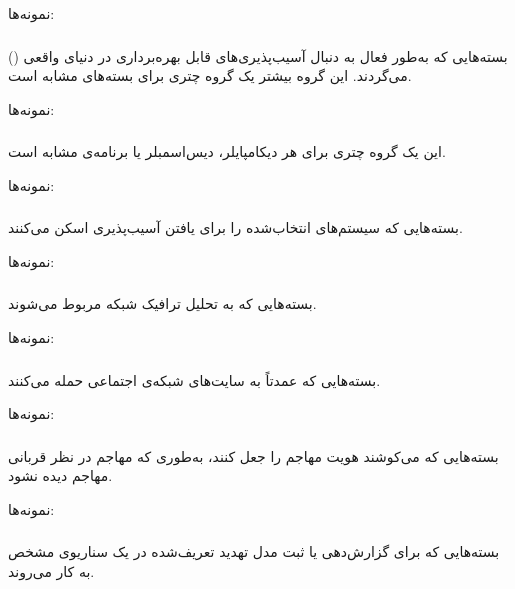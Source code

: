 \documentclass[a4paper, oneside, 11pt]{book}
\begin{document}
نمونه‌ها: 

\subsubsection{}
بسته‌هایی که به‌طور فعال به دنبال آسیب‌پذیری‌های قابل بهره‌برداری در دنیای واقعی
() می‌گردند. این گروه بیشتر یک گروه چتری برای بسته‌های مشابه است.

نمونه‌ها: 

\subsubsection{}
این یک گروه چتری برای هر دیکامپایلر، دیس‌اسمبلر یا برنامه‌ی مشابه است.

نمونه‌ها: 

\subsubsection{}
بسته‌هایی که سیستم‌های انتخاب‌شده را برای یافتن آسیب‌پذیری اسکن می‌کنند.

نمونه‌ها: 

\subsubsection{}
بسته‌هایی که به تحلیل ترافیک شبکه مربوط می‌شوند.

نمونه‌ها: 

\subsubsection{}
بسته‌هایی که عمدتاً به سایت‌های شبکه‌ی اجتماعی حمله می‌کنند.

نمونه‌ها: 

\subsubsection{}
بسته‌هایی که می‌کوشند هویت مهاجم را جعل کنند، به‌طوری که مهاجم در نظر قربانی
مهاجم دیده نشود.

نمونه‌ها: 

\subsubsection{}
بسته‌هایی که برای گزارش‌دهی یا ثبت مدل تهدید تعریف‌شده در یک سناریوی مشخص به کار
می‌روند.
\end{document}

